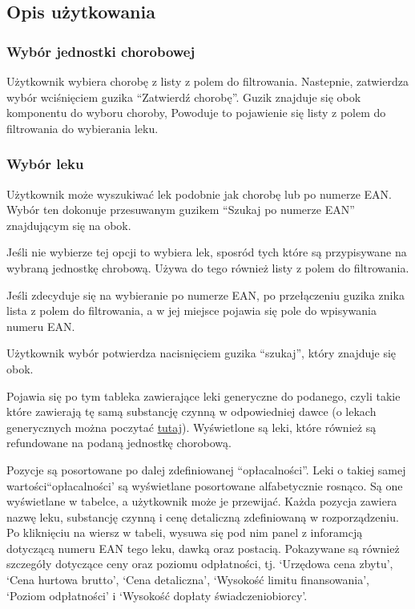 \documentclass{article}
\begin{document}
    \subsection{Opis użytkowania}
      \subsubsection{Wybór jednostki chorobowej}
      Użytkownik wybiera chorobę z listy z polem do filtrowania.
      Nastepnie, zatwierdza wybór wciśnięciem guzika ``Zatwierdź chorobę''.
      Guzik znajduje się obok komponentu do wyboru choroby,
      Powoduje to pojawienie się listy z polem do filtrowania do wybierania leku.

      \subsubsection{Wybór leku}
      Użytkownik może wyszukiwać lek podobnie jak chorobę lub po numerze EAN.
      Wybór ten dokonuje przesuwanym guzikem ``Szukaj po numerze EAN'' znajdującym się na obok.

      Jeśli nie wybierze tej opcji to wybiera lek, sposród tych które są przypisywane na wybraną jednostkę chrobową.
      Używa do tego również listy z polem do filtrowania.

      Jeśli zdecyduje się na wybieranie po numerze EAN, po przełączeniu guzika znika lista z polem do filtrowania,
      a w jej miejsce pojawia się pole do wpisywania numeru EAN.

      Użytkownik wybór potwierdza nacisnięciem guzika ``szukaj'', który znajduje się obok.

      Pojawia się po tym tableka zawierające leki generyczne do podanego, czyli takie które zawierają tę samą substancję czynną w odpowiedniej dawce
      (o lekach generycznych można poczytać \href{https://pl.wikipedia.org/wiki/Lek_generyczny}{tutaj}).
      Wyświetlone są leki, które również są refundowane na podaną jednostkę chorobową.

      Pozycje są posortowane po dalej zdefiniowanej ``opłacalności''.
      Leki o takiej samej wartości``opłacalności' są wyświetlane posortowane alfabetycznie rosnąco.
      Są one wyświetlane w tabelce, a użytkownik może je przewijać.
      Każda pozycja zawiera nazwę leku, substancję czynną i cenę detaliczną zdefiniowaną w rozporządzeniu.
      Po kliknięciu na wiersz w tabeli, wysuwa się pod nim panel z inforamcją dotyczącą numeru EAN tego leku, dawką oraz postacią.
      Pokazywane są również szczegóły dotyczące ceny oraz poziomu odpłatności, tj.
      `Urzędowa cena zbytu',
      `Cena hurtowa brutto',
      `Cena detaliczna',
      `Wysokość limitu finansowania',
      `Poziom odpłatności' i
      `Wysokość dopłaty świadczeniobiorcy'.
\end{document}
